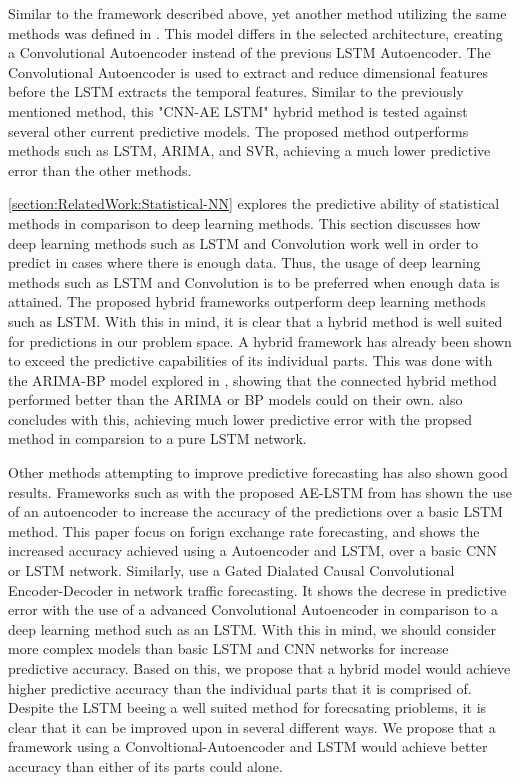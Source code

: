 Similar to the framework described above, yet another method utilizing the same methods was defined in \cite{Zhao2019}.
This model differs in the selected architecture, creating a Convolutional Autoencoder instead of the previous LSTM Autoencoder.
The Convolutional Autoencoder is used to extract and reduce dimensional features before the LSTM extracts the temporal features.
Similar to the previously mentioned method, this "CNN-AE LSTM" hybrid method is tested against several other current predictive models.
The proposed method outperforms methods such as LSTM, ARIMA, and SVR, achieving a much lower predictive error than the other methods.


\ref{section:RelatedWork:Statistical-NN} explores the predictive ability of statistical methods in comparison to deep learning methods.
This section discusses how deep learning methods such as LSTM and Convolution work well in order to predict in cases where there is enough data.
Thus, the usage of deep learning methods such as LSTM and Convolution is to be preferred when enough data is attained.
The proposed hybrid frameworks outperform deep learning methods such as LSTM.
With this in mind, it is clear that a hybrid method is well suited for predictions in our problem space.
A hybrid framework has already been shown to exceed the predictive capabilities of its individual parts.
This was done with the ARIMA-BP model explored in \cite{Bowen2020}, showing that the connected hybrid method performed better than the ARIMA or BP models could on their own.
\cite{Zhao2019} also concludes with this, achieving much lower predictive error with the propsed method in comparsion to a pure LSTM network.

Other methods attempting to improve predictive forecasting has also shown good results.
Frameworks such as with the proposed AE-LSTM from \cite{VanHoa2021} has shown the use of an autoencoder to increase the accuracy of the predictions over a basic LSTM method.
This paper focus on forign exchange rate forecasting, and shows the increased accuracy achieved using a Autoencoder and LSTM, over a basic CNN or LSTM network.
Similarly, \cite{Zhang2020} use a Gated Dialated Causal Convolutional Encoder-Decoder in network traffic forecasting.
It shows the decrese in predictive error with the use of a advanced Convolutional Autoencoder in comparison to a deep learning method such as an LSTM.
With this in mind, we should consider more complex models than basic LSTM and CNN networks for increase predictive accuracy.
Based on this, we propose that a hybrid model would achieve higher predictive accuracy than the individual parts that it is comprised of.
Despite the LSTM beeing a well suited method for forecsating prioblems, it is clear that it can be improved upon in several different ways.
We propose that a framework using a Convoltional-Autoencoder and LSTM would achieve better accuracy than either of its parts could alone.

